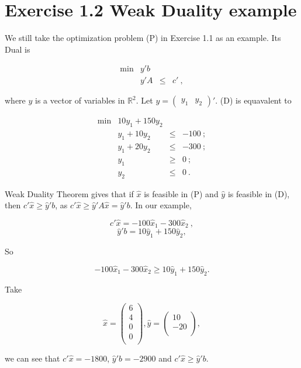 \section{Exercise 1.2 Weak Duality example}

We still take the optimization problem (P) in Exercise 1.1 as an example. Its Dual is

\[
\begin{array}{rrcl}
 \min & y'b  &      &   \\
      &  y'A  &   \leq  & c'~,
\end{array}
\tag{D}
\]

where $y$ is a vector of variables in $ \mathbb{R}^2$. Let 
$y = 
\left(
\begin{array}{cc}
 y_1 & y_2 
\end{array}
\right)'$. (D) is equavalent to 

\[
\begin{array}{rrcl}
 \min & 10y_1+150y_2  &      &   \\
      &  y_1+10y_2  &   \leq  & -100~; \\
      & y_1 + 20y_2 & \leq & -300~; \\
      & y_1 & \geq & 0~;\\
      & y_2 & \leq & 0~.
\end{array}
\]

Weak Duality Theorem gives that if $\hat{x}$ is feasible in (P) and $\hat{y}$ is feasible in (D), then $c'\hat{x} \geq \hat{y}'b$, as $c'\hat{x} \geq \hat{y}'A\hat{x} = \hat{y}'b$. In our example,

$$c'\hat{x} = -100\hat{x}_1 - 300 \hat{x}_2~,$$
$$\hat{y}'b = 10\hat{y}_1 + 150\hat{y}_2,$$

So

$$-100\hat{x}_1 - 300 \hat{x}_2 \geq 10\hat{y}_1 + 150\hat{y}_2.$$

Take \

$$\hat{x} = 
\left(
\begin{array}{c}
 6 \\
 4 \\
 0 \\
 0 \\
\end{array}
\right),
\hat{y} =
\left(
\begin{array}{c}
 10 \\
 -20 \\
\end{array}
\right),
$$

we can see that $c'\hat{x} = -1800$, $\hat{y}'b = -2900$ and $c'\hat{x} \geq \hat{y}'b$.